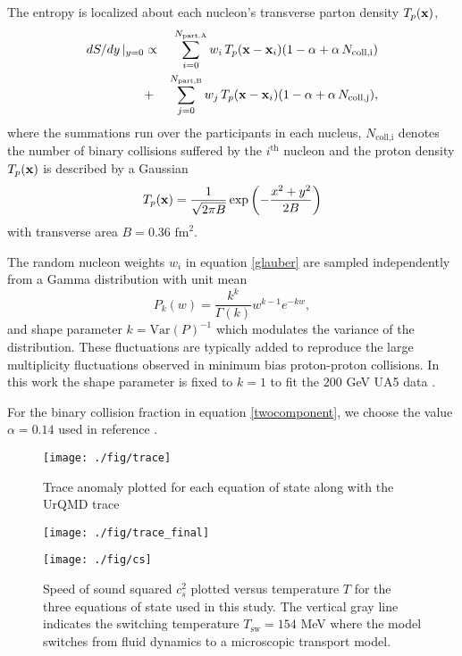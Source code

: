 \documentclass[aps,prc,reprint,amsmath,nofootinbib,superscriptaddress]{revtex4-1}
\begin{document}
The entropy is localized about each nucleon's transverse parton density $T_p({\bf x})$,
\begin{eqnarray}
 dS/dy \,\vert_{y=0} &\propto& \sum\limits_{i=0}^{N_\text{part,A}} w_i\, T_p({\bf x} - {\bf x}_i)(1-\alpha + \alpha\, N_\text{coll,i}) \nonumber \\
                     &+& \sum\limits_{j=0}^{N_\text{part,B}} w_j\, T_p({\bf x} - {\bf x}_i)(1-\alpha + \alpha\, N_\text{coll,j}),
 \label{glauber}
\end{eqnarray}
where the summations run over the participants in each nucleus, $N_\text{coll,i}$ denotes the number of binary collisions suffered by the $i^\text{th}$ 
nucleon and the proton density $T_p({\bf x})$ is described by a Gaussian
\begin{equation}
 T_p({\bf x}) = \frac{1}{\sqrt{2 \pi B}} \exp \left(-\frac{x^2+y^2}{2 B} \right)
\end{equation}
with transverse area $B = 0.36$ $\text{fm}^2$.

The random nucleon weights $w_i$ in equation \eqref{glauber} are sampled independently from a Gamma distribution with unit mean
\begin{equation}
 P_k(w) = \frac{k^k}{\Gamma(k)} w^{k-1} e^{-k w},
\end{equation}
and shape parameter $k = \text{Var}(P)^{-1}$ which modulates the variance of the distribution. These fluctuations are typically added \cite{?} to reproduce 
the large multiplicity fluctuations observed in minimum bias proton-proton collisions. In this work the shape parameter is fixed to $k=1$ to fit the $200$ 
GeV UA5 data \cite{?}. 

For the binary collision fraction in equation \eqref{twocomponent}, we choose the value $\alpha=0.14$ used in reference \cite{?}.
\begin{figure}[t]
  \texttt{[image: ./fig/trace]}
  \caption{\label{fig:eos} Trace anomaly plotted for each equation of state along with the UrQMD trace}
\end{figure}

\begin{figure}[b]
  \texttt{[image: ./fig/trace\_final]}
  \caption{\label{fig:eos} }
\end{figure}

\begin{figure}
  \texttt{[image: ./fig/cs]}
  \caption{\label{fig:eos} Speed of sound squared $c_s^2$ plotted versus temperature $T$ for the three equations of state used in this study. The vertical
	   gray line indicates the switching temperature $T_\text{sw} = 154$ MeV where the model switches from fluid dynamics to a microscopic transport model.}
\end{figure}
\end{document}
